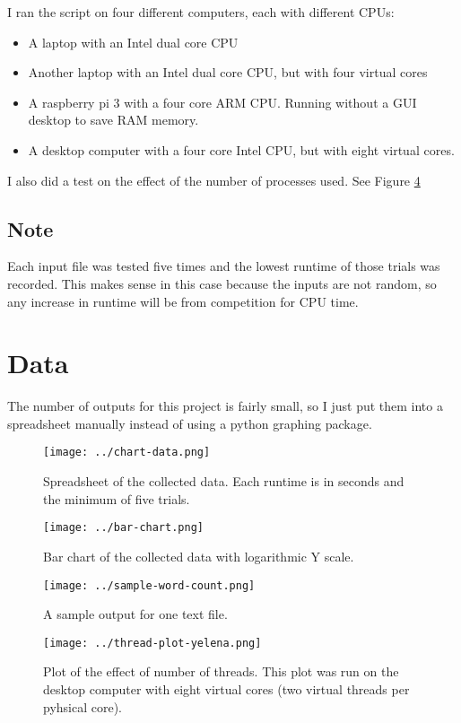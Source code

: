 \documentclass[12pt, letterpaper]{article}
\begin{document}
I ran the script on four different computers, each with different CPUs:
\begin{itemize}
\item  A laptop with an Intel dual core CPU
\item Another laptop with an Intel dual core CPU, but with four virtual cores
\item A raspberry pi 3 with a four core ARM CPU. Running without a GUI desktop to save RAM memory.
\item A desktop computer with a four core Intel CPU, but with eight virtual cores.
\end{itemize}

I also did a test on the effect of the number of processes used. See Figure \ref{fig:thread-yelena}

\subsection{Note}
Each input file was tested five times and the lowest runtime of those trials was recorded. This makes sense in this case because the inputs are not random, so any increase in runtime will be from competition for CPU time.

\section{Data}
The number of outputs for this project is fairly small, so I just put them into a spreadsheet manually instead of using a python graphing package.

\begin{figure}[h]
  \centering
  \texttt{[image: ../chart-data.png]}
  \caption{Spreadsheet of the collected data. Each runtime is in seconds and the minimum of five trials.}
  \label{fig:spread}
\end{figure}

\begin{figure}[h]
  \centering
  \texttt{[image: ../bar-chart.png]}
  \caption{Bar chart of the collected data with logarithmic Y scale.}
  \label{fig:bar}
\end{figure}

\begin{figure}
  \centering
  \texttt{[image: ../sample-word-count.png]}
  \caption{A sample output for one text file.}
  \label{fig:sample}
\end{figure}

\begin{figure}
  \centering
  \texttt{[image: ../thread-plot-yelena.png]}
  \caption{Plot of the effect of number of threads. This plot was run on the desktop computer with eight virtual cores (two virtual threads per pyhsical core).}
  \label{fig:thread-yelena}
\end{figure}
\end{document}
